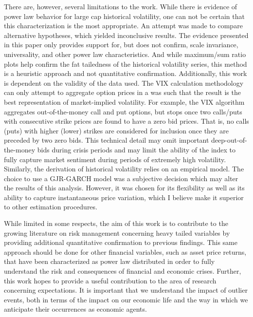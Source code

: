 \documentclass[11pt,a4paper,oldfontcommands]{memoir}
\begin{document}
{There are, however, several limitations to the work. While there is evidence of power law behavior for large cap historical volatility, one can not be certain that this characterization is the most appropriate. An attempt was made to compare alternative hypotheses, which yielded inconclusive results. The evidence presented in this paper only provides support for, but does not confirm, scale invariance, universality, and other power law characteristics. And while maximum/sum ratio plots help confirm the fat tailedness of the historical volatility series, this method is a heuristic approach and not quantitative confirmation. Additionally, this work is dependent on the validity of the data used. The VIX calculation methodology can only attempt to aggregate option prices in a was such that the result is the best representation of market-implied volatility. For example, the VIX algorithm aggregates out-of-the-money call and put options, but stops once two calls/puts with consecutive strike prices are found to have a zero bid prices. That is, no calls (puts) with higher (lower) strikes are considered for inclusion once they are preceded by two zero bids. This technical detail may omit important deep-out-of-the-money bids during crisis periods and may limit the ability of the index to fully capture market sentiment during periods of extremely high volatility. Similarly, the derivation of historical volatility relies on an empirical model. The choice to use a GJR-GARCH model was a subjective decision which may alter the results of this analysis. However, it was chosen for its flexibility as well as its ability to capture instantaneous price variation, which I believe make it superior to other estimation procedures. 

While limited in some respects, the aim of this work is to contribute to the growing literature on risk management concerning heavy tailed variables by providing additional quantitative confirmation to previous findings. This same approach should be done for other financial variables, such as asset price returns, that have been characterized as power law distributed in order to fully understand the risk and consequences of financial and economic crises. Further, this work hopes to provide a useful contribution to the area of research concerning expectations. It is important that we understand the impact of outlier events, both in terms of the impact on our economic life and the way in which we anticipate their occurrences as economic agents. 



}
\end{document}

